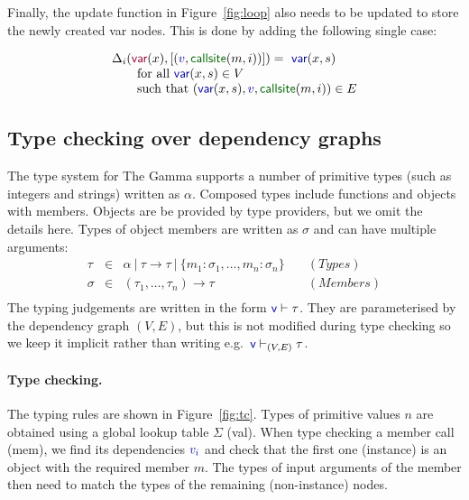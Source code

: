 \documentclass[acmsmall,anonymous,fleqn]{acmart}\settopmatter{printfolios=false,printccs=false,printacmref=false}
\theoremstyle{plain}
\theoremstyle{definition}
\newcommand{\ident}[1]{\textnormal{\textcolor{idclr}{\sffamily #1}}}
\newcommand{\bndclr}[1]{\textcolor{kvdclr}{#1}}
\newcommand{\bnd}[1]{\textnormal{\textcolor{kvdclr}{\sffamily #1}}}
\newcommand{\bknd}[1]{\textnormal{\textcolor{prepclr}{\sffamily #1}}}
\newcommand{\blbl}[1]{\textnormal{\textcolor{numclr}{\sffamily #1}}}
\newcommand{\rname}[1]{{\sffamily\small(#1)}}
\begin{document}
Finally, the \ident{update} function in Figure~\ref{fig:loop} also needs to be updated to store the
newly created \bnd{var} nodes. This is done by adding the following single case:

\begin{equation*}
\begin{array}{l}
\Delta_{i}(\bknd{var}(x), [(\bndclr{v},\blbl{callsite}(m,i))]) = \bnd{var}(x, s)\\
\quad\quad \textnormal{for all}~\bnd{var}(x, s) \in V\\
\quad\quad \textnormal{such that}~(\bnd{var}(x, s), \bndclr{v}, \blbl{callsite}(m,i)) \in E
\end{array}
\end{equation*}


\subsection{Type checking over dependency graphs}
\label{sec:types-graph}

The type system for The Gamma supports a number of primitive types (such as integers and strings)
written as $\alpha$. Composed types include functions and objects with members. Objects are be
provided by type providers, but we omit the details here. Types of object members are written as
$\sigma$ and can have multiple arguments:
%
\begin{equation*}
\begin{array}{lcll}
\tau&\in&\alpha ~|~ \tau \rightarrow \tau ~|~ \{m_1\!:\!\sigma_1, \ldots, m_n\!:\!\sigma_n\} &\quad(\textit{Types})\\
\sigma &\in& (\tau_1, \ldots, \tau_n) \rightarrow \tau &\quad(\textit{Members})\\
\end{array}
\end{equation*}
%
The typing judgements are written in the form $\bnd{v}\vdash \tau$. They are parameterised by the
dependency graph $(V, E)$, but this is not modified during type checking so we keep it implicit
rather than writing e.g.~$\bnd{v}\vdash_{(V,E)} \tau$.

\paragraph{Type checking.}
The typing rules are shown in Figure~\ref{fig:tc}. Types of primitive values $n$ are obtained
using a global lookup table $\Sigma$ \rname{val}. When type checking a member call \rname{mem},
we find its dependencies $\bndclr{v_i}$ and check that the first one (instance) is an object with
the required member $m$. The types of input arguments of the member then need to match the types
of the remaining (non-instance) nodes.
\end{document}
